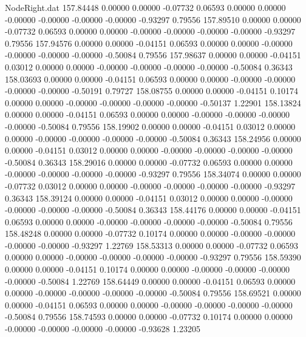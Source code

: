 \begin{filecontents}{NodeRight.dat}
 157.84448    0.00000    0.00000    -0.07732    0.06593    0.00000    0.00000   -0.00000   -0.00000   -0.00000   -0.00000   -0.93297    0.79556
 157.89510    0.00000    0.00000    -0.07732    0.06593    0.00000    0.00000   -0.00000   -0.00000   -0.00000   -0.00000   -0.93297    0.79556
 157.94576    0.00000    0.00000    -0.04151    0.06593    0.00000    0.00000   -0.00000   -0.00000   -0.00000   -0.00000   -0.50084    0.79556
 157.98637    0.00000    0.00000    -0.04151    0.03012    0.00000    0.00000   -0.00000   -0.00000   -0.00000   -0.00000   -0.50084    0.36343
 158.03693    0.00000    0.00000    -0.04151    0.06593    0.00000    0.00000   -0.00000   -0.00000   -0.00000   -0.00000   -0.50191    0.79727
 158.08755    0.00000    0.00000    -0.04151    0.10174    0.00000    0.00000   -0.00000   -0.00000   -0.00000   -0.00000   -0.50137    1.22901
 158.13824    0.00000    0.00000    -0.04151    0.06593    0.00000    0.00000   -0.00000   -0.00000   -0.00000   -0.00000   -0.50084    0.79556
 158.19902    0.00000    0.00000    -0.04151    0.03012    0.00000    0.00000   -0.00000   -0.00000   -0.00000   -0.00000   -0.50084    0.36343
 158.24956    0.00000    0.00000    -0.04151    0.03012    0.00000    0.00000   -0.00000   -0.00000   -0.00000   -0.00000   -0.50084    0.36343
 158.29016    0.00000    0.00000    -0.07732    0.06593    0.00000    0.00000   -0.00000   -0.00000   -0.00000   -0.00000   -0.93297    0.79556
 158.34074    0.00000    0.00000    -0.07732    0.03012    0.00000    0.00000   -0.00000   -0.00000   -0.00000   -0.00000   -0.93297    0.36343
 158.39124    0.00000    0.00000    -0.04151    0.03012    0.00000    0.00000   -0.00000   -0.00000   -0.00000   -0.00000   -0.50084    0.36343
 158.44176    0.00000    0.00000    -0.04151    0.06593    0.00000    0.00000   -0.00000   -0.00000   -0.00000   -0.00000   -0.50084    0.79556
 158.48248    0.00000    0.00000    -0.07732    0.10174    0.00000    0.00000   -0.00000   -0.00000   -0.00000   -0.00000   -0.93297    1.22769
 158.53313    0.00000    0.00000    -0.07732    0.06593    0.00000    0.00000   -0.00000   -0.00000   -0.00000   -0.00000   -0.93297    0.79556
 158.59390    0.00000    0.00000    -0.04151    0.10174    0.00000    0.00000   -0.00000   -0.00000   -0.00000   -0.00000   -0.50084    1.22769
 158.64449    0.00000    0.00000    -0.04151    0.06593    0.00000    0.00000   -0.00000   -0.00000   -0.00000   -0.00000   -0.50084    0.79556
 158.69521    0.00000    0.00000    -0.04151    0.06593    0.00000    0.00000   -0.00000   -0.00000   -0.00000   -0.00000   -0.50084    0.79556
 158.74593    0.00000    0.00000    -0.07732    0.10174    0.00000    0.00000   -0.00000   -0.00000   -0.00000   -0.00000   -0.93628    1.23205

\end{filecontents}
